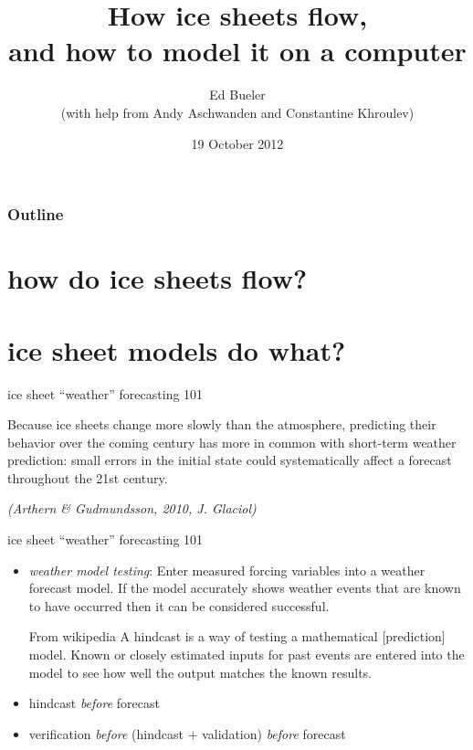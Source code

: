 \documentclass[hide notes,intlimits]{beamer}
\title[ice sheet modelling]{How ice sheets flow, \\ and how to model it on a computer}
\author[Bueler]{Ed Bueler \\ \medskip \scriptsize (with help from Andy Aschwanden and Constantine Khroulev)}
\institute{
  Dept.~of Mathematics and Statistics \\
  and Geophysical Institute\\
  UAF
}
\date{19 October 2012}
\begin{document}


  {
} 


\begin{frame}
  \titlepage
\end{frame}

{
%
} 

\begin{frame}
   \frametitle{Outline}
   \tableofcontents[subsectionstyle=hide/hide/hide]
\end{frame}
  
\section{how do ice sheets flow?}


\section{ice sheet models do what?}

\begin{frame}{ice sheet ``weather'' forecasting 101}

Because ice sheets change more slowly than the atmosphere, predicting their
behavior over the coming century has more in common with short-term
weather prediction: \alert{small errors in the initial state could
systematically affect a forecast throughout the 21st century}.

\medskip
\emph{(Arthern \& Gudmundsson, 2010, J. Glaciol)}
\end{frame}


\begin{frame}{ice sheet ``weather'' forecasting 101}

\begin{itemize}
\item \emph{weather model testing}:  Enter measured forcing variables into a weather forecast model.  If the model accurately shows weather events that are known to have occurred then it can be considered successful.
\bigskip

  \begin{block}{From wikipedia} A \alert{hindcast} is a way of testing a
mathematical [prediction] model. Known or closely estimated inputs for past events
are entered into the model to see how well the output matches the
known results.
  \end{block}

\bigskip
\item hindcast \emph{before} forecast
\item verification \emph{before} (hindcast $+$ validation) \emph{before} forecast
\end{itemize}
\end{frame}
\end{document}

